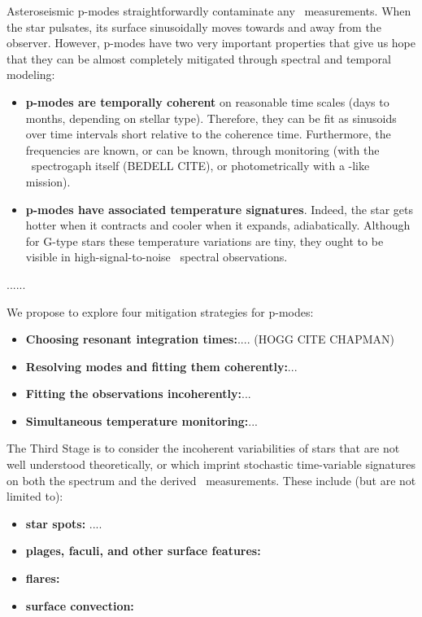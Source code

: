 \documentclass[12pt, letterpaper]{article}
\begin{document}

Asteroseismic p-modes straightforwardly contaminate any \EPRV\ measurements.
When the star pulsates, its surface sinusoidally moves towards and away from
the observer.
However, p-modes have two very important properties that give us hope that they
can be almost completely mitigated through spectral and temporal modeling:
\begin{itemize}
\item
\textbf{p-modes are temporally coherent} on reasonable time scales (days to months, depending on
stellar type). Therefore, they can be fit as sinusoids over time intervals 
short relative to the coherence time. Furthermore, the frequencies are known,
or can be known, through monitoring (with the \EPRV\ spectrogaph itself (BEDELL CITE),
or photometrically with a \TESS-like mission).
\item
\textbf{p-modes have associated temperature signatures}. Indeed, the star gets
hotter when it contracts and cooler when it expands, adiabatically. Although for
G-type stars these temperature variations are tiny, they ought to be visible in
high-signal-to-noise \EPRV\ spectral observations.
\end{itemize}

......

We propose to explore four mitigation strategies for p-modes:
\begin{itemize}
\item
\textbf{Choosing resonant integration times:}.... (HOGG CITE CHAPMAN)
\item
\textbf{Resolving modes and fitting them coherently:}...
\item
\textbf{Fitting the observations incoherently:}...
\item
\textbf{Simultaneous temperature monitoring:}...
\end{itemize}


The Third Stage is to consider the incoherent variabilities of stars
that are not well understood theoretically, or which imprint
stochastic time-variable signatures on both the spectrum and the
derived \RV\ measurements.
These include (but are not limited to):
\begin{itemize}
\item
\textbf{star spots:} ....
\item
\textbf{plages, faculi, and other surface features:}
\item
\textbf{flares:}
\item
\textbf{surface convection:}
\end{itemize}
\end{document}
